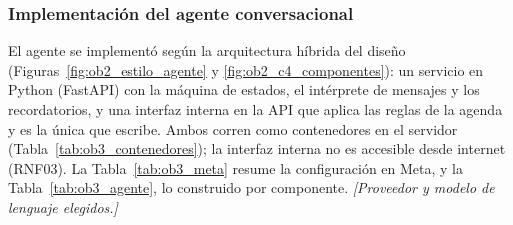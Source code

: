 
\subsubsection{Implementación del agente conversacional}

El agente se implementó según la arquitectura híbrida del diseño (Figuras~\ref{fig:ob2_estilo_agente} y \ref{fig:ob2_c4_componentes}): un servicio en Python (FastAPI) con la máquina de estados, el intérprete de mensajes y los recordatorios, y una interfaz interna en la API que aplica las reglas de la agenda y es la única que escribe. Ambos corren como contenedores en el servidor (Tabla~\ref{tab:ob3_contenedores}); la interfaz interna no es accesible desde internet (RNF03). La Tabla~\ref{tab:ob3_meta} resume la configuración en Meta, y la Tabla~\ref{tab:ob3_agente}, lo construido por componente. \textit{[Proveedor y modelo de lenguaje elegidos.]}


